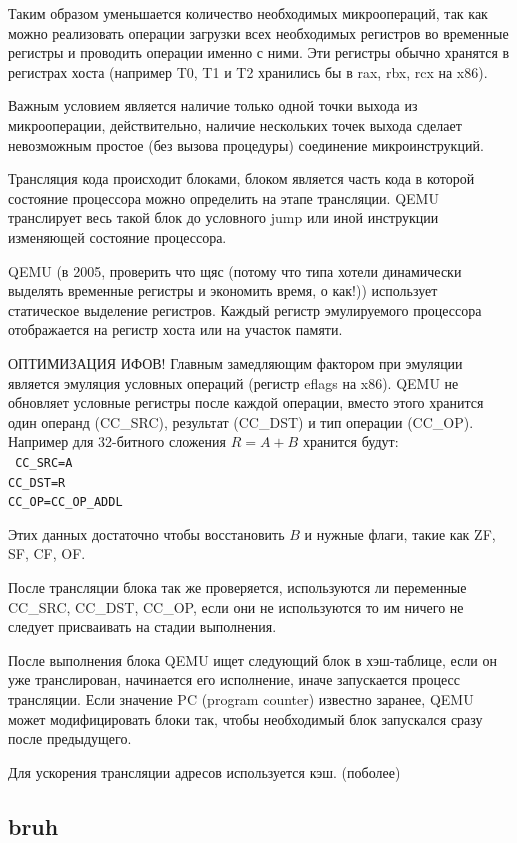 Таким образом уменьшается количество необходимых микроопераций, так как можно реализовать операции загрузки всех необходимых регистров во временные регистры и проводить операции именно с ними. Эти регистры обычно хранятся в регистрах хоста (например T0, T1 и T2 хранились бы в rax, rbx, rcx на x86).

Важным условием является наличие только одной точки выхода из микрооперации, действительно, наличие нескольких точек выхода сделает невозможным простое (без вызова процедуры) соединение микроинструкций.

Трансляция кода происходит блоками, блоком является часть кода в которой состояние процессора можно определить на этапе трансляции. QEMU транслирует весь такой блок до условного jump или иной инструкции изменяющей состояние процессора.

QEMU (в 2005, проверить что щяс (потому что типа хотели динамически выделять временные регистры и экономить время, о как!)) использует статическое выделение регистров. Каждый регистр эмулируемого процессора отображается на регистр хоста или на участок памяти.

ОПТИМИЗАЦИЯ ИФОВ! Главным замедляющим фактором при эмуляции является эмуляция условных операций (регистр eflags на x86). QEMU не обновляет условные регистры после каждой операции, вместо этого хранится один операнд (CC\_SRC), результат (CC\_DST) и тип операции (CC\_OP). Например для 32-битного сложения $R = A + B$ хранится будут:\\
\texttt{
CC\_SRC=A\\
CC\_DST=R\\
CC\_OP=CC\_OP\_ADDL
}

Этих данных достаточно чтобы восстановить $B$ и нужные флаги, такие как ZF, SF, CF, OF.

После трансляции блока так же проверяется, используются ли переменные CC\_SRC, CC\_DST, CC\_OP, если они не используются то им ничего не следует присваивать на стадии выполнения.

После выполнения блока QEMU ищет следующий блок в хэш-таблице, если он уже транслирован, начинается его исполнение, иначе запускается процесс трансляции. Если значение PC (program counter) известно заранее, QEMU может модифицировать блоки так, чтобы необходимый блок запускался сразу после предыдущего.

Для ускорения трансляции адресов используется кэш. (поболее)

\subsection{bruh}

